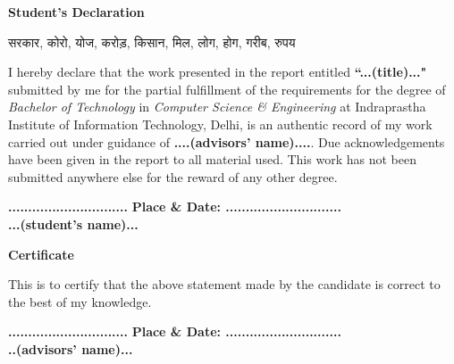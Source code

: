 \documentclass[letterpaper,11pt]{report}
\begin{document}


%

\newpage

\begin{center}
  \textbf{\Large Student's Declaration}\label{section:declaration}
\end{center}
\begin{hindi}

  सरकार, कोरो, योज, करोड़, किसान, मिल, लोग, होग, गरीब, रुपय

\end{hindi}
I hereby declare that the work presented in the report entitled \textbf{``...(title)..."} submitted by me for the partial fulfillment of the requirements for the degree of \emph{Bachelor of Technology} in \emph{Computer Science \& Engineering} at
Indraprastha Institute of Information Technology, Delhi, is an authentic record of my work carried out under guidance of \textbf{....(advisors' name)....}. Due acknowledgements have  been given in the report to all material used. This work has not been submitted anywhere else for the reward of any other degree.
\\ \vspace{0.5in}

\textbf{..............................}\hfill
\textbf{ Place \& Date: .............................} \\
\textbf{...(student's name)...}




\vspace{3in}
\begin{center}
  \textbf{\Large Certificate} \label{section:certificate}
\end{center}
This is to certify that the above statement made by the candidate is correct to the best of my knowledge.
\\ \vspace{0.4in}

\textbf{..............................}\hfill
\textbf{ Place \& Date: .............................} \\
\textbf{..(advisors' name)...}\\



\pagebreak
\end{document}
